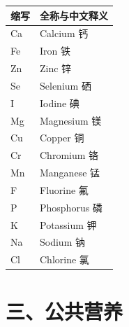 \begin{table}[H]
\centering
\begin{tabularx}{\textwidth}{lX}
\toprule
\textbf{缩写} & \textbf{全称与中文释义} \\
\midrule
Ca & Calcium \hfill 钙 \\
Fe & Iron \hfill 铁 \\
Zn & Zinc \hfill 锌 \\
Se & Selenium \hfill 硒 \\
I & Iodine \hfill 碘 \\
Mg & Magnesium \hfill 镁 \\
Cu & Copper \hfill 铜 \\
Cr & Chromium \hfill 铬 \\
Mn & Manganese \hfill 锰 \\
F & Fluorine \hfill 氟 \\
P & Phosphorus \hfill 磷 \\
K & Potassium \hfill 钾 \\
Na & Sodium \hfill 钠 \\
Cl & Chlorine \hfill 氯 \\
\bottomrule
\end{tabularx}
\end{table}

\section{三、公共营养}

